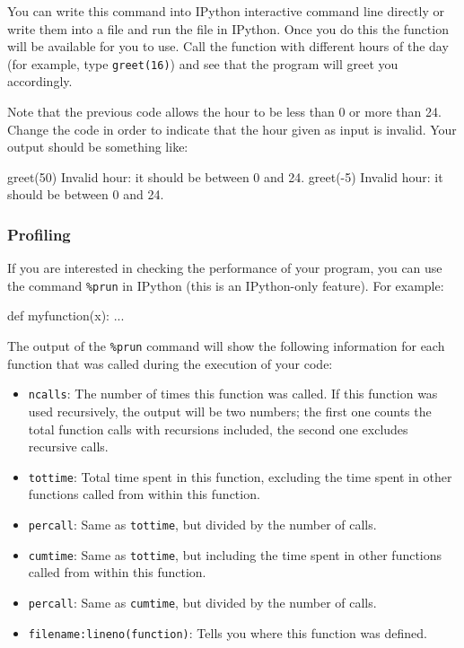 You can write this command into IPython interactive command line directly or write them into a file and run the file in IPython. Once you do this the function will be available for you to use. Call the function  with different hours of the day (for example, type \texttt{greet(16)}) and see that the program will greet you accordingly.

\begin{exercise}
Note that the previous code allows the hour to be less than 0 or more than 24. Change the code in order to indicate that the hour given as input is invalid. Your output should be something like:

\begin{python}
greet(50)
Invalid hour: it should be between 0 and 24.
greet(-5)
Invalid hour: it should be between 0 and 24.
\end{python}

\end{exercise}

\subsubsection{Profiling}

If you are interested in checking the performance of your program, you can use the command \texttt{\%prun} in IPython (this is an IPython-only feature). For example:

\begin{python}
def myfunction(x):
    ...

\end{python}

The output of the \texttt{\%prun} command will show the following information for each function that was called during the execution of your code:

\begin{itemize}
\item \texttt{ncalls}: The number of times this function was called. If this function was used recursively, the output will be two numbers; the first one counts the total function calls with recursions included, the second one excludes recursive calls.
\item \texttt{tottime}: Total time spent in this function, excluding the time spent in other functions called from within this function.
\item \texttt{percall}: Same as \texttt{tottime}, but divided by the number of calls.
\item \texttt{cumtime}: Same as \texttt{tottime}, but including the time spent in other functions called from within this function.
\item \texttt{percall}: Same as \texttt{cumtime}, but divided by the number of calls.
\item \texttt{filename:lineno(function)}: Tells you where this function was defined.
\end{itemize}

